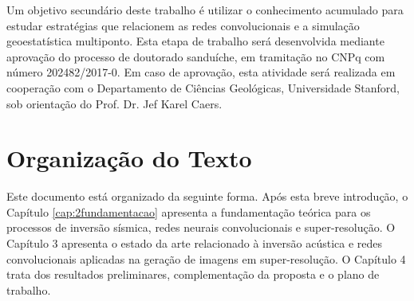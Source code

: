 Um objetivo secundário deste trabalho é utilizar o conhecimento acumulado para estudar estratégias que
relacionem as redes convolucionais e a simulação geoestatística multiponto. Esta etapa de trabalho será desenvolvida
mediante aprovação do processo de doutorado sanduíche, em tramitação no CNPq com número 202482/2017-0.
Em caso de aprovação, esta atividade será realizada em cooperação com o Departamento
de Ciências Geológicas, Universidade Stanford, sob orientação do Prof. Dr. Jef Karel Caers.

\section{Organização do Texto}

Este documento está organizado da seguinte forma. Após esta breve introdução, o
Capítulo \ref{cap:2fundamentacao} apresenta a fundamentação teórica para os
processos de inversão sísmica, redes neurais 
convolucionais e super-resolução. O Capítulo 3 %
apresenta o estado da arte relacionado à inversão acústica  e
redes convolucionais aplicadas na geração de imagens em super-resolução. 
O Capítulo 4 %
trata dos resultados preliminares, complementação da proposta e o plano de trabalho.
